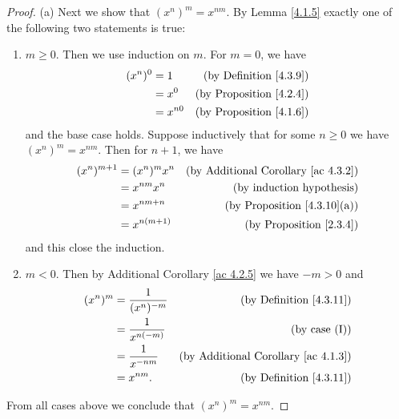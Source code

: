 \begin{proof}{(a)}
    Next we show that \((x^n)^m = x^{nm}\).
    By Lemma \ref{4.1.5} exactly one of the following two statements is true:
    \begin{enumerate}[label=(\Roman*)]
        \item \(m \geq 0\).
              Then we use induction on \(m\).
              For \(m = 0\), we have
              \begin{align*}
                  (x^n)^0 & = 1      & \text{(by Definition \ref{4.3.9})}  \\
                          & = x^0    & \text{(by Proposition \ref{4.2.4})} \\
                          & = x^{n0} & \text{(by Proposition \ref{4.1.6})}
              \end{align*}
              and the base case holds.
              Suppose inductively that for some \(n \geq 0\) we have \((x^n)^m = x^{nm}\).
              Then for \(n + 1\), we have
              \begin{align*}
                  (x^n)^{m + 1} & = (x^n)^m x^n  & \text{(by Additional Corollary \ref{ac 4.3.2})} \\
                                & = x^{nm} x^n   & \text{(by induction hypothesis)}                \\
                                & = x^{nm + n}   & \text{(by Proposition \ref{4.3.10}(a))}         \\
                                & = x^{n(m + 1)} & \text{(by Proposition \ref{2.3.4})}
              \end{align*}
              and this close the induction.
        \item \(m < 0\).
              Then by Additional Corollary \ref{ac 4.2.5} we have \(-m > 0\) and
              \begin{align*}
                  (x^n)^m & = \frac{1}{(x^n)^{-m}} & \text{(by Definition \ref{4.3.11})}             \\
                          & = \frac{1}{x^{n(-m)}}  & \text{(by case (I))}                            \\
                          & = \frac{1}{x^{-nm}}    & \text{(by Additional Corollary \ref{ac 4.1.3})} \\
                          & = x^{nm}.              & \text{(by Definition \ref{4.3.11})}
              \end{align*}
    \end{enumerate}
    From all cases above we conclude that \((x^n)^m = x^{nm}\).


\end{proof}
